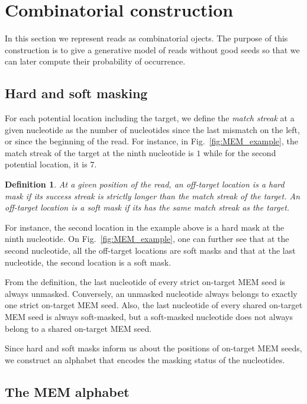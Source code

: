 \documentclass{article}
\newtheorem{definition}{Definition}
\begin{document}
\section{Combinatorial construction}

In this section we represent reads as combinatorial ojects. The purpose of
this construction is to give a generative model of reads without good
seeds so that we can later compute their probability of occurrence.

\subsection{Hard and soft masking}

For each potential location including the target, we define the
\emph{match streak} at a given nucleotide as the number of nucleotides
since the last mismatch on the left, or since the beginning of the read.
For instance, in Fig.~\ref{fig:MEM_example}, the match streak of the
target at the ninth nucleotide is $1$ while for the second potential
location, it is $7$.

\begin{definition}
At a given position of the read, an off-target location is a \emph{hard
mask} if its success streak is strictly longer than the match streak of
the target. An off-target location is a \emph{soft mask} if its has the
same match streak as the target.
\end{definition}

For instance, the second location in the example above is a hard mask at
the ninth nucleotide. On Fig.~\ref{fig:MEM_example}, one can further see
that at the second nucleotide, all the off-target locations are soft masks
and that at the last nucleotide, the second location is a soft mask.

From the definition, the last nucleotide of every strict on-target MEM
seed is always unmasked. Conversely, an unmasked nucleotide always belongs
to exactly one strict on-target MEM seed. Also, the last nucleotide of
every shared on-target MEM seed is always soft-masked, but a soft-masked
nucleotide does not always belong to a shared on-target MEM seed.

Since hard and soft masks inform us about the positions of on-target
MEM seeds, we construct an alphabet that encodes the masking status of the
nucleotides.

\subsection{The MEM alphabet}
\end{document}
